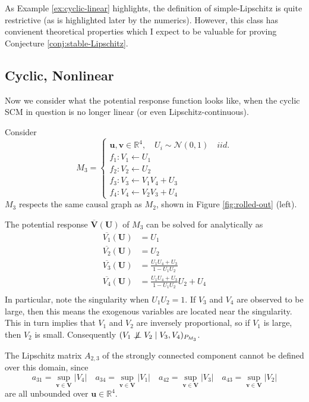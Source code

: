 \documentclass[12pt]{article}
\begin{document}
\begin{remark}
As Example \ref{ex:cyclic-linear} highlights, the definition of simple-Lipschitz is quite restrictive (as is highlighted later by the numerics). However, this class has convienent theoretical properties which I expect to be valuable for proving Conjecture \ref{conj:stable-Lipschitz}.
\end{remark}



\subsection{Cyclic, Nonlinear}
Now we consider what the potential response function looks like, when the cyclic SCM in question is no longer linear (or even Lipschitz-continuous).

\begin{example}\label{ex:cyclic-nonlinear}
Consider
\[
M_3 = 
\begin{cases}
\mathbf{u}, \mathbf{v}\in \mathbb{R}^4, \quad U_i \sim \mathcal{N}(0,1) \quad iid. \\
f_1:V_1\leftarrow U_1 \\
f_2:V_2\leftarrow U_2 \\
f_3:V_3\leftarrow V_1V_4+U_3 \\
f_4:V_4\leftarrow V_2V_3+U_4
\end{cases}
\]
$M_3$ respects the same causal graph as $M_2$, shown in Figure \ref{fig:rolled-out} (left).

The potential response $\overline{\mathbf{V}}(\mathbf{U})$ of $M_3$ can be solved for analytically as
\begin{align*}
\overline{V_1}(\mathbf{U}) &= U_1 \\
\overline{V_2}(\mathbf{U}) &= U_2 \\
\overline{V_3}(\mathbf{U}) &= \frac{U_1U_4 + U_3}{1-U_1U_2} \\
\overline{V_4}(\mathbf{U}) &= \frac{U_1U_4 + U_3}{1-U_1U_2}U_2 + U_4 \\
\end{align*}
In particular, note the singularity when $U_1U_2=1$. If $V_3$ and $V_4$ are observed to be large, then this means the exogenous variables are located near the singularity. This in turn implies that $V_1$ and $V_2$ are inversely proportional, so if $V_1$ is large, then $V_2$ is small. Consequently $(V_1 \nCI V_2 \mid V_3,V_4)_{P_{M_3}}$.

The Lipschitz matrix $A_{2,3}$ of the strongly connected component cannot be defined over this domain, since
\[
a_{31} = \sup_{\mathbf{v}\in\mathbf{V}}\lvert V_4\rvert \quad
a_{34} = \sup_{\mathbf{v}\in\mathbf{V}}\lvert V_1\rvert \quad
a_{42} = \sup_{\mathbf{v}\in\mathbf{V}}\lvert V_3\rvert \quad
a_{43} = \sup_{\mathbf{v}\in\mathbf{V}}\lvert V_2\rvert 
\]
are all unbounded over $\mathbf{u}\in \mathbb{R}^4$.
\end{example}
\end{document}
